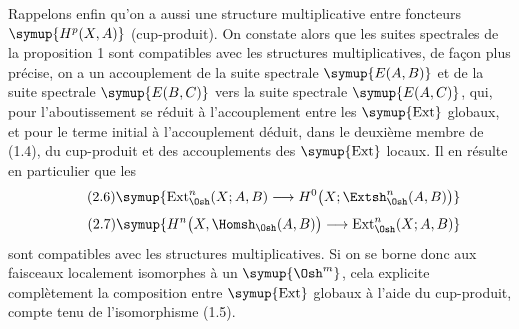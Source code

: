 Rappelons enfin qu'on a aussi une structure multiplicative entre foncteurs
$\symup{H^{p}(X,A)}$ (cup-produit). On constate alors que les suites spectrales de la
proposition 1 sont compatibles avec les structures multiplicatives, de façon
plus précise, on a un accouplement de la suite spectrale $\symup{E(A,B)}$ et de la suite
spectrale $\symup{E(B,C)}$ vers la suite spectrale $\symup{E(A,C)}$, qui, pour l'aboutissement
se réduit à l'accouplement entre les $\symup{\operatorname{Ext}}$ globaux, et pour le
terme initial à l'accouplement déduit, dans le deuxième membre de (1.4), du
cup-produit et des accouplements des $\symup{\operatorname{Ext}}$ locaux. Il en résulte
en particulier que les 
\begin{equation}\tag{2.6}
  \symup{\operatorname{Ext}_{\Osh}^{n}(X;A,B)
  \longrightarrow H^{0}\bigl(X;\Extsh_{\Osh}^{n}(A,B)\bigr)}
\end{equation}
\begin{equation}\tag{2.7}
  \symup{H^{n}\bigl(X,\Homsh_{\Osh}(A,B)\bigr)
  \longrightarrow\operatorname{Ext}_{\Osh}^{n}(X;A,B)}
\end{equation}
sont compatibles avec les structures multiplicatives. Si on se borne donc aux
faisceaux localement isomorphes à un $\symup{\Osh^{m}}$, cela explicite complètement la
composition entre $\symup{\operatorname{Ext}}$ globaux à l'aide du cup-produit, compte
tenu de l'isomorphisme (1.5).


